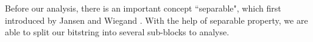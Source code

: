 \documentclass[a4paper,11pt]{report}
\theoremstyle{plain} %
\theoremstyle{definition} %
\theoremstyle{remark} %
\newtheorem*{rem}{Remark}
\begin{document}
\begin{comment}
\begin{tcolorbox}
$\textbf{Cooperative Coevolutionary (1+1) Algorithm:}$

\bigskip
$\mathbf{Require:}$ 

\quad A finite state space $\mathcal{X}=\{0,1\}$, and initial population  $P_{0}\in \mathcal{X}^{\lambda }$, where $\lambda = n \in \mathbb{N}$ is population size 

\quad \textit{Selection Mechanism} $p_{sel}:\mathcal{X}^{\lambda } \times \mathcal{X}^{l} \rightarrow [0,1]$. 


\quad \textit{Mutation Operator} $p_{mul}:\mathcal{X}^l \times \mathcal{X} \rightarrow [0,1]$

\bigskip

1: \textbf{Initialization:}  Independently for each $i \in \{1, \cdots ,k \}$ choose $x_{0}^{(i)} \in \{0,1\}^l$ uniformly random. $t:= -1$;

2: $a:=1; t:= t+1;$

3: \textbf{Mutation:} Create $y^{(a)}$ by copying $x_{t}^{(a)}$ and independently for each bit, flip this bit according to probability $p_{mut}(y,\cdot)= \min\{1/l, 1/2\}$;

4: \textbf{Selection:} Sample $i$-th parent $x$ according to $p_{sel}(P_{t},\cdot)$. In this case, if $f(x_{t+1}^{(1)} \cdots y^{(a)} \cdots x_{t}^{(k)}) \geq f(x_{t+1}^{(1)} \cdots x_{t}^{(a)} \cdots x_{t}^{(k)})$, set $x_{t+1}^{(a)} := y^{(a)}$, else set $x_{t+1}^{(a)} := x_{t}^{(a)}$;


5: $a:=a+1$

6: If $a>k$, then repeat line $2$, else continue at line $3$.

\end{tcolorbox}
\end{comment}

\begin{comment}
\begin{rem}
Both $p_{sel}$ and $p_{mul}$ represent the mechanism probability. In this case, selection mechanism will update each block according to fitness value $f$ until we run through all $k$ blocks. 
\end{rem}

\end{comment}

\par Before our analysis, there is an important concept ``separable", which first introduced by Jansen and Wiegand \citep{jansen_cooperative_2004}. With the help of separable property, we are able to split our bitstring into several sub-blocks to analyse.
\end{document}
